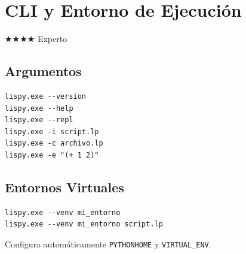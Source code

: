 \chapter{CLI y Entorno de Ejecución}
\label{chap:cli}
{\huge$\bigstar$}{\huge$\bigstar$}{\huge$\bigstar$}{\huge$\bigstar$} Experto

\section{Argumentos}
\begin{verbatim}
lispy.exe --version
lispy.exe --help
lispy.exe --repl
lispy.exe -i script.lp
lispy.exe -c archivo.lp
lispy.exe -e "(+ 1 2)"
\end{verbatim}

\section{Entornos Virtuales}
\begin{verbatim}
lispy.exe --venv mi_entorno
lispy.exe --venv mi_entorno script.lp
\end{verbatim}
Configura automáticamente \texttt{PYTHONHOME} y \texttt{VIRTUAL\_ENV}.

